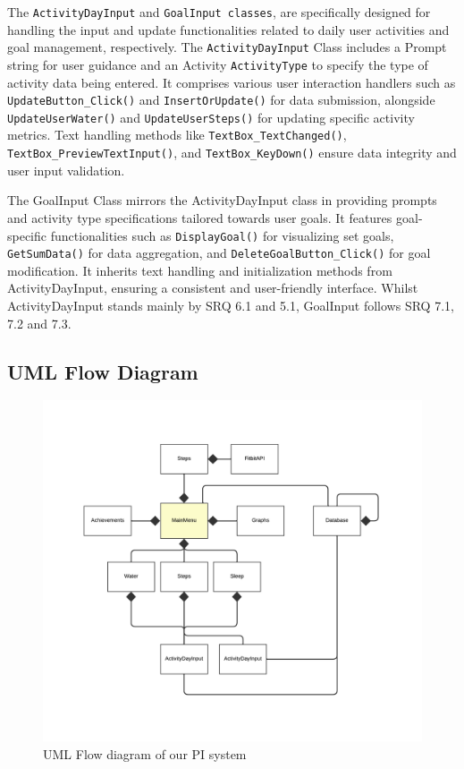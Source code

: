 \documentclass[12pt]{article}
\begin{document}
The \texttt{ActivityDayInput} and \texttt{GoalInput classes},
are specifically designed for handling the input and update functionalities
related to daily user activities and goal management, respectively. The
\texttt{ActivityDayInput} Class includes a Prompt string for user guidance and an
Activity \texttt{ActivityType} to specify the type of activity data being entered. It
comprises various user interaction handlers such as \texttt{UpdateButton\_Click()} and
\texttt{InsertOrUpdate()} for data submission, alongside \texttt{UpdateUserWater()} and
\texttt{UpdateUserSteps()} for updating specific activity metrics. Text handling methods
like \texttt{TextBox\_TextChanged()}, \texttt{TextBox\_PreviewTextInput()}, and
\texttt{TextBox\_KeyDown()} ensure data integrity and user input validation.\par

The GoalInput Class mirrors the ActivityDayInput class in providing prompts and
activity type specifications tailored towards user goals. It features
goal-specific functionalities such as \texttt{DisplayGoal()} for visualizing set goals,
\texttt{GetSumData()} for data aggregation, and \texttt{DeleteGoalButton\_Click()} for
goal modification. It inherits text handling and initialization methods from
ActivityDayInput, ensuring a consistent and user-friendly interface. Whilst
ActivityDayInput stands mainly by SRQ 6.1 and 5.1, GoalInput follows SRQ 7.1, 7.2 and 7.3.\par

\subsection{UML Flow Diagram}

\begin{figure}[!ht]
  \centering
  \includegraphics[width = 0.7\linewidth]{UML Flow diagram}
  \caption{UML Flow diagram of our PI system}
  \label{fig:flow}
\end{figure}
\end{document}
